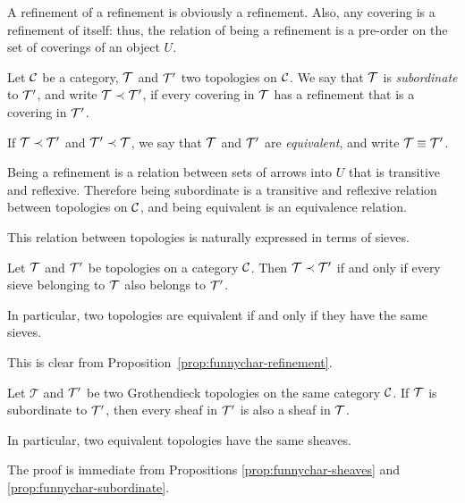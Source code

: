\begin{2   CONTRAVARIANT FUNCTORS}
\begin{2.3 Sheaves in Grothendieck topologies}
A refinement of a refinement is obviously a refinement. Also, any covering is a refinement of itself: thus, the relation of being a refinement is a pre-order on the set of coverings of an object $U$.

\begin{definition}\label{def:same-sheaves}
Let $\mathcal{C}$ be a category, $\mathcal{T}$ and $\mathcal{T}'$ two topologies on $\mathcal{C}$. We say that $\mathcal{T}$ is \emph{subordinate} to $\mathcal{T}'$, and write $\mathcal{T} \prec \mathcal{T}'$, if every covering in $\mathcal{T}$ has a refinement that is a covering in $\mathcal{T}'$.

If $\mathcal{T} \prec \mathcal{T}'$ and $\mathcal{T}' \prec \mathcal{T}$, we say that $\mathcal{T}$ and $\mathcal{T}'$ are \emph{equivalent}, and write $\mathcal{T} \equiv \mathcal{T}'$.
\end{definition}

Being a refinement is a relation between sets of arrows into $U$ that is transitive and reflexive. Therefore being subordinate is a transitive and reflexive relation between topologies on $\mathcal{C}$, and being equivalent is an equivalence relation.

This relation between topologies is naturally expressed in terms of sieves.

\begin{proposition}\label{prop:funnychar-subordinate}
Let $\mathcal{T}$ and $\mathcal{T}'$ be topologies on a category $\mathcal{C}$. Then $\mathcal{T} \prec \mathcal{T}'$ if and only if every sieve belonging to $\mathcal{T}$ also belongs to $\mathcal{T}'$.

In particular, two topologies are equivalent if and only if they have the same sieves.
\end{proposition}

This is clear from Proposition~\ref{prop:funnychar-refinement}.

\begin{proposition}\label{prop:same-sheaves}
Let $\mathcal T$ and $\mathcal{T}'$ be two Grothendieck topologies on the same category $\mathcal{C}$. If $\mathcal{T}$ is subordinate to $\mathcal{T}'$, then every sheaf in $\mathcal{T}'$ is also a sheaf in $\mathcal{T}$.

In particular, two equivalent topologies have the same sheaves.
\end{proposition}

The proof is immediate from Propositions \ref{prop:funnychar-sheaves} and \ref{prop:funnychar-subordinate}.


\end{2.3 Sheaves in Grothendieck topologies}
\end{2   CONTRAVARIANT FUNCTORS}
